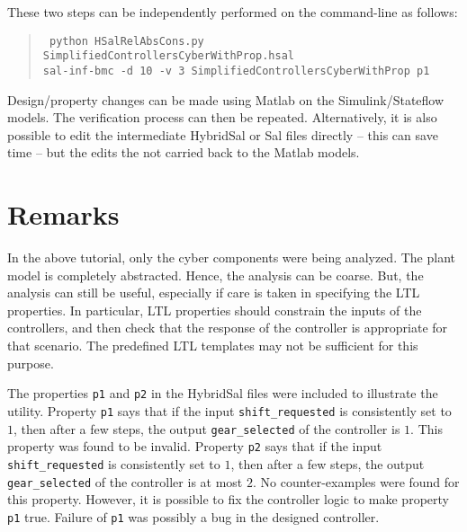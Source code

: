 \documentclass{llncs}
\begin{document}
These two steps can be independently performed on the command-line
as follows:
\begin{quote}
  {\tt{
      python HSalRelAbsCons.py SimplifiedControllersCyberWithProp.hsal
      \\
      sal-inf-bmc -d 10 -v 3 SimplifiedControllersCyberWithProp p1
  }}
\end{quote}

Design/property changes can
be made using Matlab on the Simulink/Stateflow models.
The verification process can then be repeated.
Alternatively, it is also possible to edit the
intermediate HybridSal or Sal files directly --
this can save time -- but the edits the not carried
back to the Matlab models.

\section{Remarks}

In the above tutorial, only the cyber components
were being analyzed.
The plant model is completely abstracted.
Hence, the analysis can be coarse.
But, the analysis can still be useful, especially
if care is taken in specifying the LTL properties.
In particular, LTL properties should constrain the
inputs of the controllers, and then check that the
response of the controller is appropriate for that
scenario.  The predefined LTL templates may not be
sufficient for this purpose.

The properties {\tt{p1}} and {\tt{p2}} in the
HybridSal files were included to illustrate the
utility. 
Property {\tt{p1}} says that if  the input
{\tt{shift\_requested}} is consistently set to $1$,
then after a few steps,  the output 
{\tt{gear\_selected}} of the controller is $1$.
This property was found to be invalid.
Property {\tt{p2}} says that if  the input
{\tt{shift\_requested}} is consistently set to $1$,
then after a few steps,  the output 
{\tt{gear\_selected}} of the controller is at most $2$.
No counter-examples were found for this property.
However, it is possible to fix the controller logic
to make property {\tt{p1}} true.
Failure of {\tt{p1}} was possibly a bug in the designed
controller.
\end{document}
